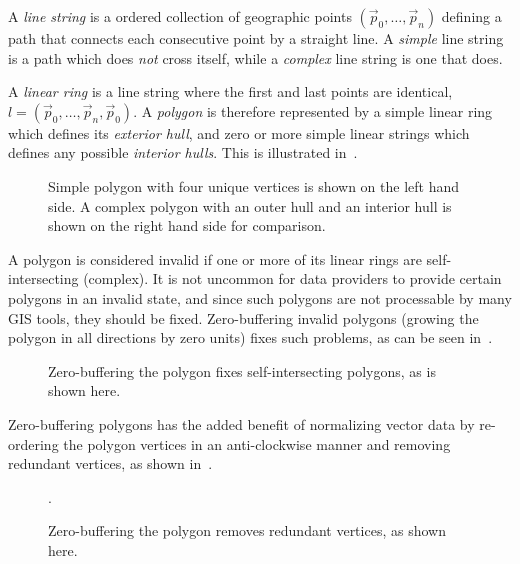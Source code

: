 A \textit{line string} is a ordered collection of geographic points $(\vec{p}_0, \ldots, \vec{p}_n)$ defining a path that connects each consecutive point by a straight line.
A \textit{simple} line string is a path which does \textit{not} cross itself, while a \textit{complex} line string is one that does.

A \textit{linear ring} is a line string where the first and last points are identical, $l = (\vec{p}_0, \ldots, \vec{p}_n, \vec{p}_0)$.
A \textit{polygon} is therefore represented by a simple linear ring which defines its \textit{exterior hull}, and zero or more simple linear strings which defines any possible \textit{interior hulls}.
This is illustrated in~.

\begin{figure}[htb]
  \centering
  
  \textcolor{gray}{\vrule}
  \hspace{0.01\linewidth}
  
  \caption{
    Simple polygon with four unique vertices is shown on the left hand side.
    A complex polygon with an outer hull
    and an interior hull is shown on the right hand side for comparison.
  }%
  \label{fig:polygon-representation}
\end{figure}

A polygon is considered invalid if one or more of its linear rings are self-intersecting (complex).
It is not uncommon for data providers to provide certain polygons in an invalid state, and since such polygons are not processable by many GIS tools, they should be fixed.
Zero-buffering invalid polygons (growing the polygon in all directions by zero units) fixes such problems, as can be seen in~.

\begin{figure}[H]
  \centering
  
  \caption{Zero-buffering the polygon fixes self-intersecting polygons, as is shown here.}%
  \label{fig:complex-zero-buffer}
\end{figure}

Zero-buffering polygons has the added benefit of normalizing vector data by re-ordering the polygon vertices in an anti-clockwise manner and removing redundant vertices, as shown in~.

\begin{figure}[H]
  \centering
  
  \caption{Zero-buffering the polygon removes redundant vertices, as shown here.}%
  \label{fig:redundant-zero-buffer}.
\end{figure}

